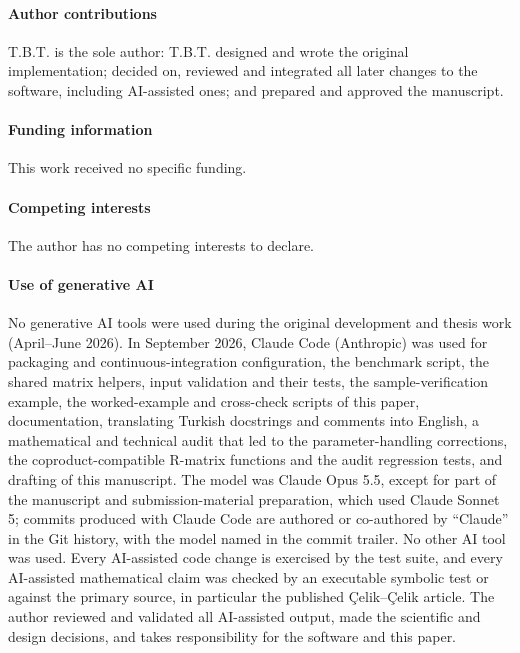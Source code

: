 \documentclass{SciPost}
\begin{document}
\paragraph{Author contributions}
T.B.T. is the sole author: T.B.T. designed and wrote the original implementation; decided on, reviewed and integrated all later changes to the software, including AI-assisted ones; and prepared and approved the manuscript.

\paragraph{Funding information}
This work received no specific funding.

\paragraph{Competing interests}
The author has no competing interests to declare.

\paragraph{Use of generative AI}
No generative AI tools were used during the original development and thesis work (April--June 2026). In September 2026, Claude Code (Anthropic) was used for packaging and continuous-integration configuration, the benchmark script, the shared matrix helpers, input validation and their tests, the sample-verification example, the worked-example and cross-check scripts of this paper, documentation, translating Turkish docstrings and comments into English, a mathematical and technical audit that led to the parameter-handling corrections, the coproduct-compatible R-matrix functions and the audit regression tests, and drafting of this manuscript. The model was Claude Opus 5.5, except for part of the manuscript and submission-material preparation, which used Claude Sonnet 5; commits produced with Claude Code are authored or co-authored by ``Claude'' in the Git history, with the model named in the commit trailer. No other AI tool was used. Every AI-assisted code change is exercised by the test suite, and every AI-assisted mathematical claim was checked by an executable symbolic test or against the primary source, in particular the published Çelik--Çelik article. The author reviewed and validated all AI-assisted output, made the scientific and design decisions, and takes responsibility for the software and this paper.
\end{document}
